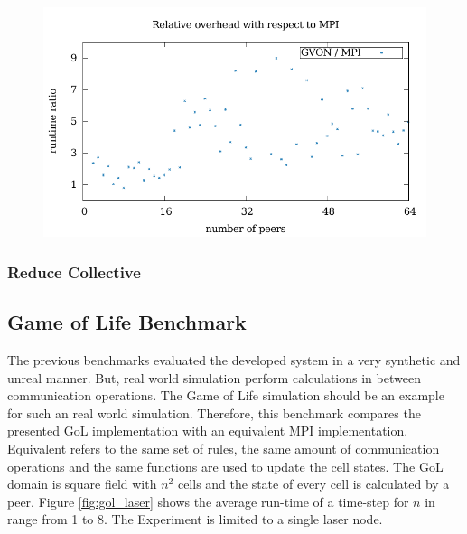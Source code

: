 \begin{figure}[H]
\begin{minipage}[t]{0.5\textwidth}
  \includegraphics[width=\textwidth]{plots/50_collective_npeers_overhead_gvon_laser}
  \end{minipage}%
  \caption{ }
  \label{fig:collective_npeers}
\end{figure}



\subsubsection*{Reduce Collective}




\subsection{Game of Life Benchmark}
The previous benchmarks evaluated the developed system in a very
synthetic and unreal manner. But, real world simulation perform
calculations in between communication operations. The Game of Life
simulation should be an example for such an real world
simulation. Therefore, this benchmark compares the presented GoL
implementation with an equivalent MPI implementation. Equivalent
refers to the same set of rules, the same amount of communication
operations and the same functions are used to update the cell states.
The GoL domain is square field with $n^2$ cells and the state of every
cell is calculated by a peer.  Figure \ref{fig:gol_laser} shows the
average run-time of a time-step for $n$ in range from 1 to 8. The
Experiment is limited to a single laser node.

